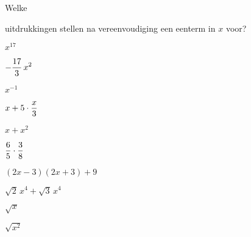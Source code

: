 \documentclass{ximera}
\begin{document}
	\author{Koen De Naeghel}
	\label{xim:veeltermen_basisbegrippen_oefeningen_reeks1}


\begin{exercise}
\hypertarget{oef1.1}{Welke} uitdrukkingen stellen na vereenvoudiging een eenterm in $x$ voor? 
\renewcommand{\TJa }{\makebox[2.5cm]{Een eenterm }}
\renewcommand{\TNee}{\makebox[2.5cm]{Geen eenterm}}

\begin{multicols}{2}
	\begin{question} \choiceYes  \( x^{17}                         \)   \end{question}
	\begin{question} \choiceYes  \( \displaystyle -\frac{17}{3}\,x^2          \)   \end{question}
	\begin{question} \choiceNo   \( x^{-1}                         \)   \end{question}
	\begin{question} \choiceYes  \( \displaystyle x + 5\cdot \frac{x}{3}      \)   \end{question}
	\begin{question} \choiceNo   \( x + x^2                        \)   \end{question}
	\begin{question} \choiceYes  \( \displaystyle \frac{6}{5}\cdot\frac{3}{8} \)   \end{question}
	\begin{question} \choiceYes  \( (2x-3)(2x+3)+9                 \)   \end{question}
	\begin{question} \choiceYes  \( \sqrt{2}\,x^4 + \sqrt{3}\,x^4  \)   \end{question}
	\begin{question} \choiceNo   \( \sqrt{x}                       \)   \end{question}
	\begin{question} \choiceNo   \( \sqrt{x^2}                     \)   \end{question}
\end{multicols}
\end{exercise}
\end{document}
